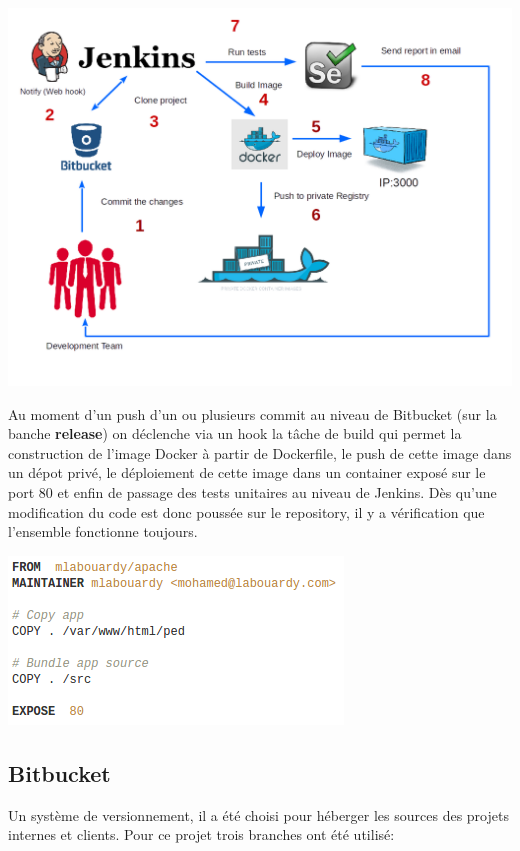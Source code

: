 \documentclass [a4paper,11pt]{article}
\begin{document}
\begin{center}
\includegraphics[scale=0.5]{img/ci.png}
\end{center}

Au moment d’un push d’un ou plusieurs commit au niveau de Bitbucket (sur la banche \textbf{release}) on déclenche via un hook la tâche de build qui permet la construction de l'image Docker à partir de Dockerfile, le push de cette image dans un dépot privé, le déploiement de cette image dans un container exposé sur le port 80 et enfin de passage des tests unitaires au niveau de Jenkins. Dès qu’une modification du code est donc poussée sur le repository, il y a vérification que l’ensemble fonctionne toujours.

\begin{center}
\includegraphics[scale=0.7]{img/Dockerfile.png}
\end{center}

\subsection{Bitbucket}

Un système de versionnement, il a été choisi pour héberger les sources des projets internes et clients.\cite{BITBUCKET} Pour ce projet trois branches ont été utilisé:\newline
\end{document}
